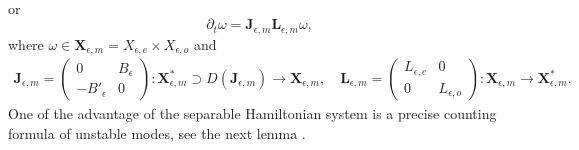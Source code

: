 \documentclass[1 [leqno, 11pt]{amsart}
\numberwithin{equation}{section}
\let\ep=\epsilon
\begin{document}
\begin{CJK*}{GBK}{song}
\begin{align}
\end{align}
or
$$\partial_t \omega = \mathbf{J}_{\ep,m} \mathbf{L}_{\ep,m}  \omega,$$
where $\omega \in \mathbf{X}_{\ep,m} = X_{\ep, e} \times X_{\ep, o}$ and
\begin{align*}\mathbf{J}_{\ep,m} = \left( \begin{array}{cc} 0 & B_\ep \\ -B'_\ep & 0 \end{array} \right): \mathbf{X}_{\ep,m}^* \supset D(\mathbf{J}_{\ep,m}) \rightarrow \mathbf{X}_{\ep,m},\quad\mathbf{L}_{\ep,m} = \left( \begin{array}{cc} L_{\ep,e} & 0 \\ 0 & L_{\ep,o} \end{array} \right): \mathbf{X}_{\ep,m} \rightarrow \mathbf{X}_{\ep,m}^*.\end{align*}
One of the advantage of the separable Hamiltonian system is a  precise counting formula  of unstable modes, see the next lemma \cite{lin2020separable,lin2021linear}.




\end{CJK*}
\end{document}

